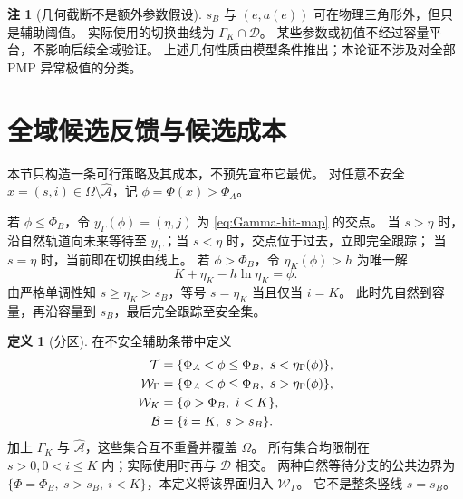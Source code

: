\documentclass[11pt,a4paper,UTF8]{ctexart}
\theoremstyle{definition}
\newtheorem{definition}[theorem]{定义}
\newtheorem{remark}[theorem]{注}
\newcommand{\Acal}{\mathcal A}
\newcommand{\Dcal}{\mathcal D}
\begin{document}
\begin{remark}[几何截断不是额外参数假设]
$s_B$ 与 $(e,a(e))$ 可在物理三角形外，但只是辅助阈值。
实际使用的切换曲线为 $\Gamma_K\cap\Dcal$。
某些参数或初值不经过容量平台，不影响后续全域验证。
上述几何性质由模型条件推出；本论证不涉及对全部 PMP 异常极值的分类。
\end{remark}

\section{全域候选反馈与候选成本}
\label{sec:synthesis}
本节只构造一条可行策略及其成本，不预先宣布它最优。
对任意不安全 $x=(s,i)\in\Omega\setminus\widehat{\Acal}$，记 $\phi=\Phi(x)>\Phi_A$。

若 $\phi\le\Phi_B$，令 $y_\Gamma(\phi)=(\eta,j)$ 为 \eqref{eq:Gamma-hit-map} 的交点。
当 $s>\eta$ 时，沿自然轨道向未来等待至 $y_\Gamma$；当 $s<\eta$ 时，交点位于过去，立即完全跟踪；
当 $s=\eta$ 时，当前即在切换曲线上。
若 $\phi>\Phi_B$，令 $\eta_K(\phi)>h$ 为唯一解
\begin{equation}
K+\eta_K-h\ln\eta_K=\phi.
\label{eq:capacity-hit-map}
\end{equation}
由严格单调性知 $s\ge\eta_K>s_B$，等号 $s=\eta_K$ 当且仅当 $i=K$。
此时先自然到容量，再沿容量到 $s_B$，最后完全跟踪至安全集。

\begin{definition}[分区]
\label{def:regions}
在不安全辅助条带中定义
\begin{align}
\mathcal T&=\{\Phi_A<\phi\le\Phi_B,\ s<\eta_\Gamma(\phi)\},\notag\\
\mathcal W_\Gamma&=\{\Phi_A<\phi\le\Phi_B,\ s>\eta_\Gamma(\phi)\},\notag\\
\mathcal W_K&=\{\phi>\Phi_B,\ i<K\},\notag\\
\mathcal B&=\{i=K,\ s>s_B\}.\label{eq:regions}
\end{align}
加上 $\Gamma_K$ 与 $\widehat{\Acal}$，这些集合互不重叠并覆盖 $\Omega$。
所有集合均限制在 $s>0,0<i\le K$ 内；实际使用时再与 $\Dcal$ 相交。
两种自然等待分支的公共边界为
$\{\Phi=\Phi_B,\ s>s_B,\ i<K\}$，本定义将该界面归入 $\mathcal W_\Gamma$。
它不是整条竖线 $s=s_B$。
\end{definition}
\end{document}
